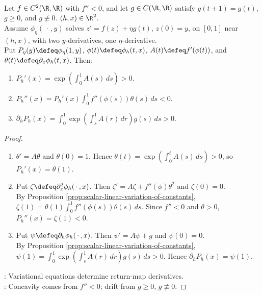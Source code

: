 \begin{proposition} \label{prop:concave-periodic-return-map-geometry} \\
Let $f\in C^2(\R,\R)$ with $f''<0$, and let $g\in C(\R,\R)$ satisfy $g(t+1)=g(t)$, $g\geq0$, and $g\not\equiv0$. $(h,x)\in\R^2$.\\
Assume $\phi_\eta(\,\cdot\,,y)$ solves $z'=f(z)+\eta g(t)$, $z(0)=y$, on $[0,1]$ near $(h,x)$, with two $y$-derivatives, one $\eta$-derivative.\\
Put $P_\eta(y)\defeq\phi_\eta(1,y)$, $\phi(t)\defeq\phi_h(t,x)$, $A(t)\defeq f'(\phi(t))$, and $\theta(t)\defeq\partial_x\phi_h(t,x)$. Then:
\begin{enumerate}[label=(\roman*)]
\setlength{\itemsep}{0pt}
\item $P_h'(x)=\exp\!\left(\int_0^1A(s)\,ds\right)>0$.
\item $P_h''(x)=P_h'(x)\int_0^1f''(\phi(s))\theta(s)\,ds<0$.
\item $\partial_hP_h(x)=\int_0^1\exp\!\left(\int_s^1A(r)\,dr\right)g(s)\,ds>0$.
\end{enumerate}
\begin{proof}
\begin{enumerate}[label=(\roman*)]
\setlength{\itemsep}{0pt}
\item $\theta'=A\theta$ and $\theta(0)=1$. Hence $\theta(t)=\exp\!\left(\int_0^tA(s)\,ds\right)>0$, so $P_h'(x)=\theta(1)$.
\item Put $\zeta\defeq\partial_x^2\phi_h(\,\cdot\,,x)$. Then $\zeta'=A\zeta+f''(\phi)\theta^2$ and $\zeta(0)=0$.\\
By Proposition \ref{prop:scalar-linear-variation-of-constants}, $\zeta(1)=\theta(1)\int_0^1f''(\phi(s))\theta(s)\,ds$. Since $f''<0$ and $\theta>0$, $P_h''(x)=\zeta(1)<0$.
\item Put $\psi\defeq\partial_h\phi_h(\,\cdot\,,x)$. Then $\psi'=A\psi+g$ and $\psi(0)=0$.\\
By Proposition \ref{prop:scalar-linear-variation-of-constants}, $\psi(1)=\int_0^1\exp\!\left(\int_s^1A(r)\,dr\right)g(s)\,ds>0$. Hence $\partial_hP_h(x)=\psi(1)$.
\end{enumerate}
: Variational equations determine return-map derivatives.\\
: Concavity comes from $f''<0$; drift from $g\geq0$, $g\not\equiv0$.
\end{proof}
\end{proposition}

